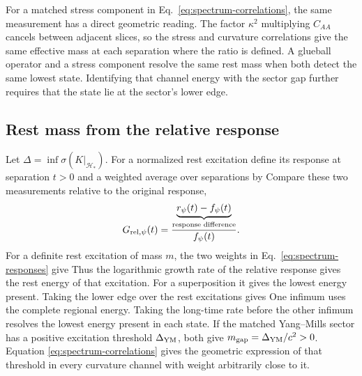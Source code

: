For a matched stress component in Eq.~\eqref{eq:spectrum-correlations}, the same measurement has a direct geometric reading. The factor \(\kappa^2\) multiplying \(C_{AA}\) cancels between adjacent slices, so the stress and curvature correlations give the same effective mass at each separation where the ratio is defined. A glueball operator and a stress component resolve the same rest mass when both detect the same lowest state. Identifying that channel energy with the sector gap further requires that the state lie at the sector's lower edge.

\subsection{Rest mass from the relative response}

\begin{theorem}
\label{thm:mass-spectrum}

Let \(\Delta=\inf\sigma(K|_{\mathcal H_*})\). For a normalized rest excitation define its response at separation \(t>0\) and a weighted average over separations by
\SpectrumResponsesDisplay
Compare these two measurements relative to the original response,
\[
 G_{{\rm rel},\psi}(t)=\frac{\underbrace{r_\psi(t)-f_\psi(t)}_{\text{\scriptsize response difference}}}{f_\psi(t)} .
\]
For a definite rest excitation of mass \(m\), the two weights in Eq.~\eqref{eq:spectrum-responses} give
\SpectrumDefiniteMassDisplay
Thus the logarithmic growth rate of the relative response gives the rest energy of that excitation. For a superposition it gives the lowest energy present. Taking the lower edge over the rest excitations gives
\SpectrumThresholdDisplay
One infimum uses the complete regional energy. Taking the long-time rate before the other infimum resolves the lowest energy present in each state. If the matched Yang--Mills sector has a positive excitation threshold \(\Delta_{\rm YM}\), both give \(m_{\rm gap}=\Delta_{\rm YM}/c^2>0\). Equation \eqref{eq:spectrum-correlations} gives the geometric expression of that threshold in every curvature channel with weight arbitrarily close to it.

\end{theorem}


